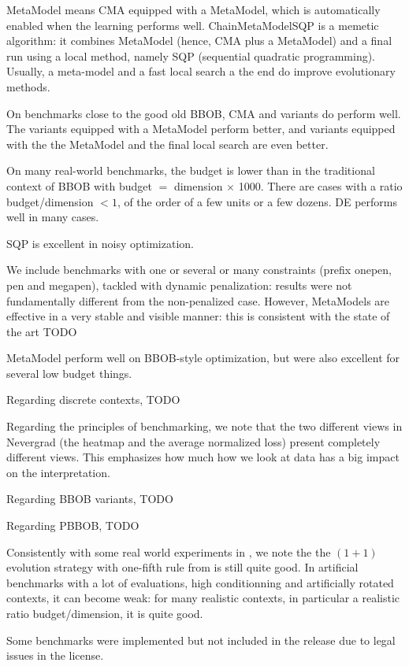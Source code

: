 MetaModel means CMA equipped with a MetaModel, which is automatically enabled when the learning performs well.
ChainMetaModelSQP is a memetic algorithm: it combines MetaModel (hence, CMA plus a MetaModel) and a final run using a local method, namely SQP (sequential quadratic programming).
Usually, a meta-model and a fast local search a the end do improve evolutionary methods.

On benchmarks close to the good old BBOB, CMA and variants do perform well. The variants equipped with a MetaModel perform better, and
variants equipped with the the MetaModel and the final local search are even better.

On many real-world benchmarks, the budget is lower than in the traditional context of BBOB with budget $=$ dimension $\times$ 1000. There
are cases with a ratio budget/dimension $<1$, of the order of a few units or a few dozens. DE performs well in many cases.

SQP is excellent in noisy optimization. 

We include benchmarks with one or several or many constraints (prefix onepen, pen and megapen), tackled with dynamic penalization: results were not fundamentally different from the non-penalized case. However, MetaModels are effective in a very stable and visible manner: this is consistent with the state of the art TODO

MetaModel perform well on BBOB-style optimization, but were also excellent for several low budget things.

Regarding discrete contexts, TODO

Regarding the principles of benchmarking, we note that the two different views in Nevergrad (the heatmap and the average normalized loss) present completely different views. This emphasizes how much how we look at data has a big impact on the interpretation.

Regarding BBOB variants, TODO

Regarding PBBOB, TODO

Consistently with some real world experiments in \cite{micropredictions1,micropredictions2}, we note the the $(1+1)$ evolution strategy with one-fifth rule from \cite{rechenberg73} is still quite good. In artificial benchmarks with a lot of evaluations, high conditionning and artificially rotated contexts, it can become weak: for many realistic contexts, in particular a realistic ratio budget/dimension, it is quite good.

Some benchmarks were implemented but not included in the release due to legal issues in the license. 
